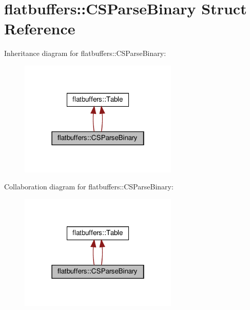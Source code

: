 \hypertarget{structflatbuffers_1_1CSParseBinary}{}\section{flatbuffers\+:\+:C\+S\+Parse\+Binary Struct Reference}
\label{structflatbuffers_1_1CSParseBinary}


Inheritance diagram for flatbuffers\+:\+:C\+S\+Parse\+Binary\+:
\nopagebreak
\begin{figure}[H]
\begin{center}
\leavevmode
\includegraphics[width=214pt]{structflatbuffers_1_1CSParseBinary__inherit__graph}
\end{center}
\end{figure}


Collaboration diagram for flatbuffers\+:\+:C\+S\+Parse\+Binary\+:
\nopagebreak
\begin{figure}[H]
\begin{center}
\leavevmode
\includegraphics[width=214pt]{structflatbuffers_1_1CSParseBinary__coll__graph}
\end{center}
\end{figure}
